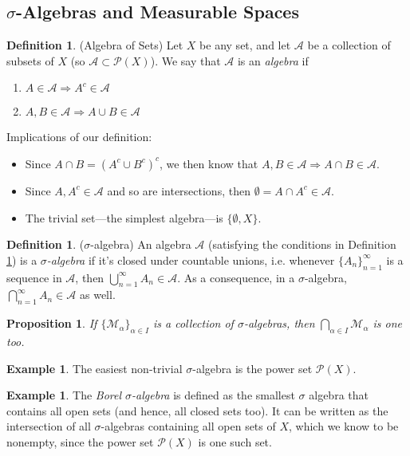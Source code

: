 \documentclass[12pt]{article}
\theoremstyle{plain}
\newtheorem{prop}[thm]{Proposition}
\theoremstyle{definition}
\newtheorem{defn}[thm]{Definition}
\newtheorem{ex}[thm]{Example}
\theoremstyle{remark}
\begin{document}
\subsection{$\sigma$-Algebras and Measurable Spaces}

\begin{defn} 
\label{algebra}
(Algebra of Sets)
Let $X$ be any set, and let $\mathscr{A}$ be a collection of subsets of $X$ (so $\mathscr{A}\subset\mathscr{P}(X)$). We say that $\mathscr{A}$ is an \emph{algebra} if 
\begin{enumerate}
    \item $A\in\mathscr{A}\Rightarrow A^c\in\mathscr{A}$
    \item $A,B\in\mathscr{A} \Rightarrow A\cup B\in\mathscr{A}$
\end{enumerate}
Implications of our definition:
\begin{itemize}
    \item Since $A\cap B = (A^c \cup B^c)^c$, we then know that $A,B\in\mathscr{A}\Rightarrow A\cap B\in \mathscr{A}$.
    \item Since $A, A^c \in \mathscr{A}$ and so are intersections, then $\emptyset = A\cap A^c \in \mathscr{A}$.
    \item The trivial set---the simplest algebra---is $\{\emptyset, X\}$.
\end{itemize}
\end{defn}

\begin{defn} 
($\sigma$-algebra)
An algebra $\mathscr{A}$ (satisfying the conditions in Definition \ref{algebra}) is a \emph{$\sigma$-algebra} if it's closed under countable unions,  i.e. whenever $\{A_n\}^\infty_{n=1}$ is a sequence in $\mathscr{A}$, then $\bigcup^\infty_{n=1} A_n \in \mathscr{A}$. As a consequence, in a $\sigma$-algebra, $\bigcap^\infty_{n=1} A_n \in \mathscr{A}$ as well.
\end{defn}

\begin{prop}
If $\{\mathscr{M}_\alpha\}_{\alpha\in I}$ is a collection of $\sigma$-algebras, then $\bigcap_{\alpha\in I} \mathscr{M}_\alpha$ is one too.
\end{prop}

\begin{ex}
The easiest non-trivial $\sigma$-algebra is the power set $\mathscr{P}(X)$.
\end{ex}

\begin{ex}
The \emph{Borel $\sigma$-algebra} is defined as the smallest $\sigma$ algebra that contains all open sets (and hence, all closed sets too). It can be written as the intersection of all $\sigma$-algebras containing all open sets of $X$, which we know to be nonempty, since the power set $\mathscr{P}(X)$ is one such set.
\end{ex}
\end{document}
